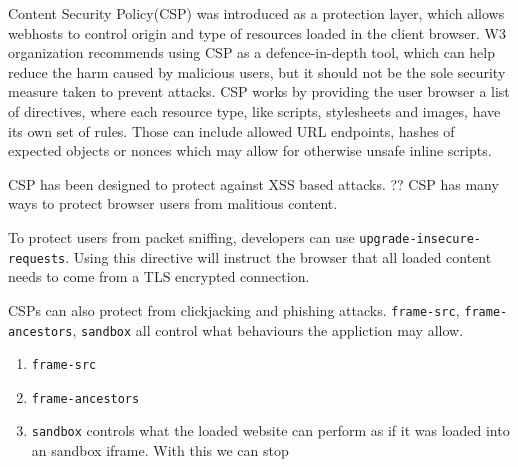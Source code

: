 \documentclass[11]{article}   %
\begin{document}
%
%

Content Security Policy(CSP) was introduced as a protection layer, which allows webhosts to control origin and type of resources loaded in the client browser. 
W3 organization recommends using CSP as a defence-in-depth tool, which can help reduce the harm caused by malicious users, but it should not be the sole security measure taken to prevent attacks.
CSP works by providing the user browser a list of directives, where each resource type, like scripts, stylesheets and images, have its own set of rules.
Those can include allowed URL endpoints, hashes of expected objects or nonces which may allow for otherwise unsafe inline scripts.

CSP has been designed to protect against XSS based attacks. ??
CSP has many ways to protect browser users from malitious content.

To protect users from packet sniffing, developers can use \texttt{upgrade-insecure-requests}.
Using this directive will instruct the browser that all loaded content needs to come from a TLS encrypted connection.

CSPs can also protect from clickjacking and phishing attacks. 
\texttt{frame-src}, \texttt{frame-ancestors}, \texttt{sandbox} all control what behaviours the appliction may allow.
\begin{enumerate}
	\item \texttt{frame-src} 
	\item \texttt{frame-ancestors}
	\item \texttt{sandbox} controls what the loaded website can perform as if it was loaded into an sandbox iframe. With this we can stop 
\end{enumerate}
\end{document}
